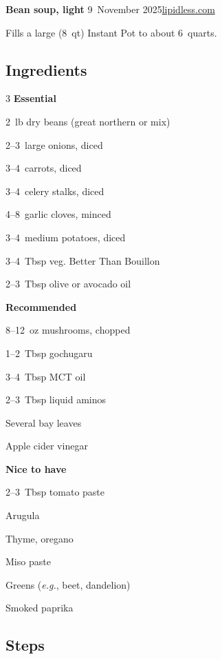 \documentclass[
    fontsize=10pt,
    letterpaper,oneside,paper=portrait
]{scrartcl}
\newcommand{\myname}{lipidless.com}
\newcommand{\mydate}{9~November 2025}
\newcommand{\mytitle}{Bean soup, light}
\newcommand{\myurl}{https://www.lipidless.com/recipes/bean-soup-light}
\begin{document}
{\sffamily \textbf{\LARGE \mytitle} \hfill \mydate \hfill \href{\myurl}{\myname}}

\vspace{\baselineskip}

Fills a large (8~qt) Instant Pot to about 6~quarts.

\subsection*{Ingredients}

{\setlength{\parskip}{0.25\baselineskip}\small

\begin{paracol}{3}
\textbf{Essential} \par
2~lb dry beans (great northern or mix) \par
2--3~large onions, diced \par
3--4~carrots, diced \par
3--4~celery stalks, diced \par
4--8~garlic cloves, minced \par
3--4~medium potatoes, diced \par
3--4~Tbsp veg. Better Than Bouillon \par
2--3~Tbsp olive or avocado oil \par
\switchcolumn
\textbf{Recommended} \par
8--12~oz mushrooms, chopped \par
1--2~Tbsp gochugaru \par
3--4~Tbsp MCT oil \par
2--3~Tbsp liquid aminos \par
Several bay leaves \par
Apple cider vinegar \par
\switchcolumn
\textbf{Nice to have} \par
2--3~Tbsp tomato paste \par
Arugula \par
Thyme, oregano \par
Miso paste \par
Greens (\textit{e.g.}, beet, dandelion) \par
Smoked paprika \par
\end{paracol}
}

\subsection*{Steps}
\end{document}
